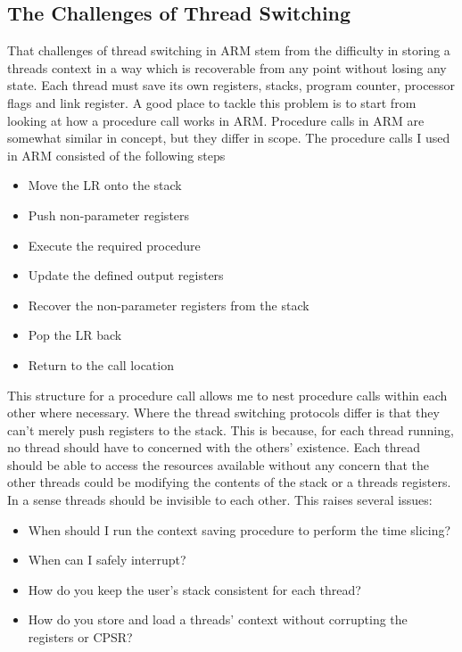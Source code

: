 \subsection{The Challenges of Thread Switching}
\label{chap:Threading}
That challenges of thread switching in ARM stem from the difficulty in storing a threads context in a way which is recoverable from any point without losing any state. Each thread must save its own registers, stacks, program counter, processor flags and link register. A good place to tackle this problem is to start from looking at how a procedure call works in ARM. Procedure calls in ARM are somewhat similar in concept, but they differ in scope. The procedure calls \cite{arm_man} I used in ARM consisted of the following steps
\begin{itemize}
	\item Move the LR onto the stack 
	\item Push non-parameter registers
	\item Execute the required procedure
	\item Update the defined output registers
	\item Recover the non-parameter registers from the stack
	\item Pop the LR back
	\item Return to the call location
\end{itemize} %
This structure for a procedure call allows me to nest procedure calls within each other where necessary. Where the thread switching protocols differ is that they can't merely push registers to the stack. This is because, for each thread running, no thread should have to concerned with the others' existence. Each thread should be able to access the resources available without any concern that the other threads could be modifying the contents of the stack or a threads registers. In a sense threads should be invisible to each other. This raises several issues:
\begin{itemize}
	\item When should I run the context saving procedure to perform the time slicing?
	\item When can I safely interrupt?
	\item How do you keep the user's stack consistent for each thread?
	\item How do you store and load a threads' context without corrupting the registers or CPSR?
\end{itemize}
